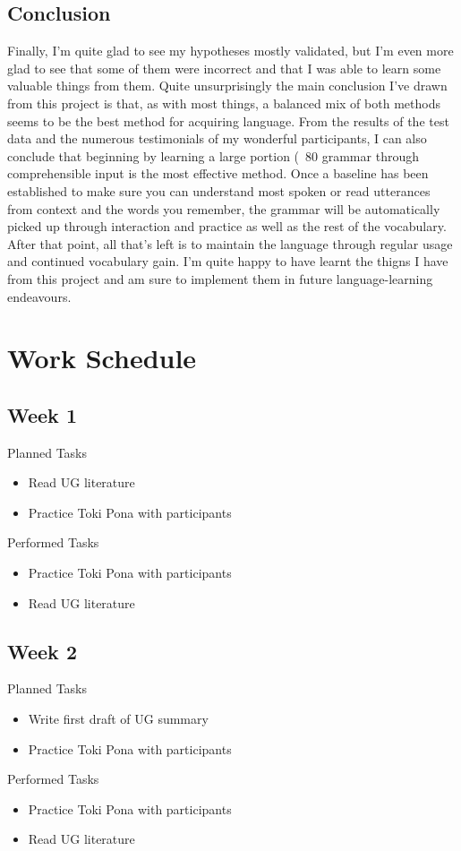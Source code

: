 \documentclass[a4paper,10pt]{article}
\begin{document}
\subsection{Conclusion}
Finally, I'm quite glad to see my hypotheses mostly validated, but I'm even more glad to see that some
of them were incorrect and that I was able to learn some valuable things from them. Quite unsurprisingly
the main conclusion I've drawn from this project is that, as with most things, a balanced mix of both
methods seems to be the best method for acquiring language. From the results of the test data and the
numerous testimonials of my wonderful participants, I can also conclude that beginning by learning
a large portion (~80%
grammar through comprehensible input is the most effective method. Once a baseline has been established
to make sure you can understand most spoken or read utterances from context and the words you remember,
the grammar will be automatically picked up through interaction and practice as well as the rest of the
vocabulary. After that point, all that's left is to maintain the language through regular usage and
continued vocabulary gain. I'm quite happy to have learnt the thigns I have from this project and am
sure to implement them in future language-learning endeavours.


\section{Work Schedule}
\subsection{Week 1}
\large{Planned Tasks}
\begin{itemize}
	\item Read UG literature
	\item Practice Toki Pona with participants
\end{itemize}
\large{Performed Tasks}
\begin{itemize}
	\item Practice Toki Pona with participants
	\item Read UG literature
\end{itemize}
\subsection{Week 2}
\large{Planned Tasks}
\begin{itemize}
	\item Write first draft of UG summary
	\item Practice Toki Pona with participants
\end{itemize}
\large{Performed Tasks}
\begin{itemize}
	\item Practice Toki Pona with participants
	\item Read UG literature
\end{itemize}
\end{document}
